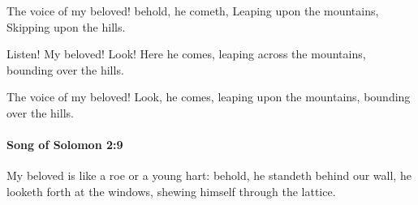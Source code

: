 			\begin{versebox}
					\item[BHS] 
					\item[LXX] 
					\item[ASV] The voice of my beloved! behold, he cometh, Leaping upon the mountains, Skipping upon the hills.
					\item[NIV] Listen! My beloved! Look! Here he comes, leaping across the mountains, bounding over the hills.
					\item[NRSV] The voice of my beloved! Look, he comes, leaping upon the mountains, bounding over the hills.
			\end{versebox}

		\paragraph{Song of Solomon 2:9} %
			\label{SONGOFSOLOMON-2-9}

			My beloved is like a roe or a young hart: behold, he standeth behind our wall, he looketh forth at the windows, shewing himself through the lattice.

